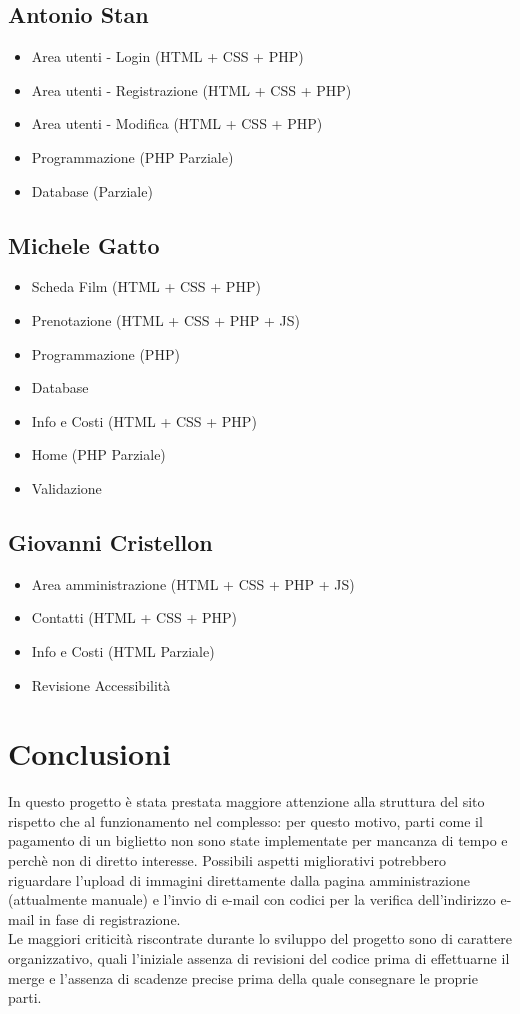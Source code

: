\documentclass[a4paper, 12pt]{article}
\begin{document}
\subsection{Antonio Stan}
\begin{itemize}
    \item Area utenti - Login (HTML + CSS + PHP)
    \item Area utenti - Registrazione (HTML + CSS + PHP)
    \item Area utenti - Modifica (HTML + CSS + PHP)
    \item Programmazione (PHP Parziale)
    \item Database (Parziale)
\end{itemize}
\subsection{Michele Gatto}
\begin{itemize}
    \item Scheda Film (HTML + CSS + PHP)
    \item Prenotazione (HTML + CSS + PHP + JS)
    \item Programmazione (PHP)
    \item Database
    \item Info e Costi (HTML + CSS + PHP)
    \item Home (PHP Parziale)
    \item Validazione
\end{itemize}
\subsection{Giovanni Cristellon}
\begin{itemize}
    \item Area amministrazione (HTML + CSS + PHP + JS)
    \item Contatti (HTML + CSS + PHP)
    \item Info e Costi (HTML Parziale)
    \item Revisione Accessibilità
\end{itemize}

\section{Conclusioni}
In questo progetto è stata prestata maggiore attenzione alla struttura del sito rispetto che al funzionamento nel complesso: per questo motivo, parti come il pagamento di un biglietto non sono state implementate
per mancanza di tempo e perchè non di diretto interesse. Possibili aspetti migliorativi potrebbero riguardare l'upload di immagini direttamente dalla pagina amministrazione (attualmente manuale) e l'invio di e-mail con codici per la verifica dell'indirizzo e-mail in fase di registrazione.\\
Le maggiori criticità riscontrate durante lo sviluppo del progetto sono di carattere organizzativo, quali l'iniziale assenza di revisioni del codice prima di effettuarne il merge e l'assenza di scadenze precise prima della quale consegnare le proprie parti.
\end{document}
